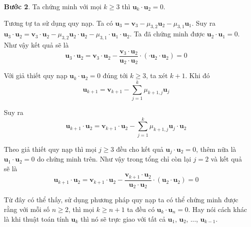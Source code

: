\textbf{Bước 2}. Ta chứng minh với mọi $k \geqslant 3$ thì $\bm{u}_k \cdot \bm{u}_2 = 0$.

Tương tự ta sử dụng quy nạp. Ta có $\bm{u}_3 = \bm{v}_3 - \mu_{3,2} \bm{u}_2 - \mu_{3,1} \bm{u}_1$. Suy ra $\bm{u}_3 \cdot \bm{u}_2 = \bm{v}_3 \cdot \bm{u}_2 - \mu_{3,2} \bm{u}_2 \cdot \bm{u}_2 - \mu_{3,1} \cdot \bm{u}_1 \cdot \bm{u}_2$. Ta đã chứng minh được $\bm{u}_2 \cdot \bm{u}_1 = 0$. Như vậy kết quả sẽ là
\[\bm{u}_3 \cdot \bm{u}_2 = \bm{v}_3 \cdot \bm{u}_2 - \dfrac{\bm{v}_3 \cdot \bm{u}_2}{\bm{u}_2 \cdot \bm{u}_2} \cdot (\cdot \bm{u}_2 \cdot \bm{u}_2) = 0\]

Với giả thiết quy nạp $\bm{u}_k \cdot \bm{u}_2 = 0$ đúng tới $k \geqslant 3$, ta xét $k+1$. Khi đó
\[\bm{u}_{k+1} = \bm{v}_{k+1} - \sum_{j=1}^k \mu_{k+1,j} \bm{u}_j\]

Suy ra
\[\bm{u}_{k+1} \cdot \bm{u}_2 = \bm{v}_{k+1} \cdot \bm{u}_2 - \sum_{j=1}^k \mu_{k+1,j} \bm{u}_j \cdot \bm{u}_2\]

Theo giả thiết quy nạp thì mọi $j \geqslant 3$ đều cho kết quả $\bm{u}_j \cdot \bm{u}_2 = 0$, thêm nữa là $\bm{u}_1 \cdot \bm{u}_2 = 0$ do chứng minh trên. Như vậy trong tổng chỉ còn lại $j=2$ và kết quả sẽ là
\[\bm{u}_{k+1} \cdot \bm{u}_2 = \bm{v}_{k+1} \cdot \bm{u}_2 - \dfrac{\bm{v}_{k+1} \cdot \bm{u}_2}{\bm{u}_2 \cdot \bm{u}_2} \cdot (\bm{u}_2 \cdot \bm{u}_2) = 0\]

Từ đây có thể thấy, sử dụng phương pháp quy nạp ta có thể chứng minh được rằng với mỗi số $n \geqslant 2$, thì mọi $k \geqslant n+1$ ta đều có $\bm{u}_k \cdot \bm{u}_n = 0$. Hay nói cách khác là khi thuật toán tính $\bm{u}_k$ thì nó sẽ trực giao với tất cả $\bm{u}_1$, $\bm{u}_2$, ..., $\bm{u}_{k-1}$.